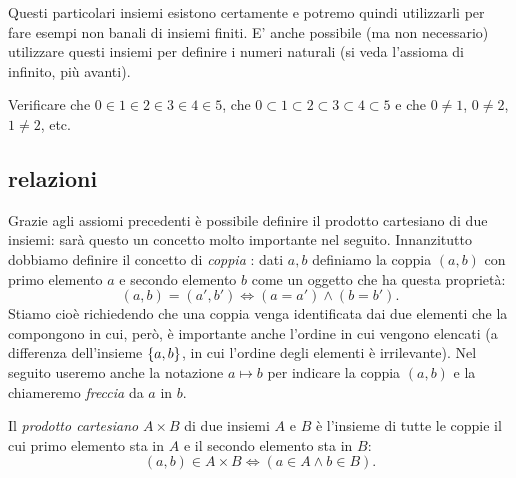 Questi particolari insiemi esistono certamente e potremo quindi utilizzarli 
per fare esempi non banali di insiemi finiti.
E' anche possibile (ma non necessario) utilizzare questi insiemi 
per definire i numeri naturali (si veda l'assioma di infinito, più avanti).

\begin{exercise}
Verificare che $0\in 1 \in 2 \in 3 \in 4 \in 5$, 
che $0\subset 1 \subset 2 \subset 3 \subset 4 \subset 5$ 
e che $0\neq 1$, $0\neq 2$, $1\neq 2$, etc.
\end{exercise}

\subsection{relazioni}

Grazie agli assiomi precedenti è possibile definire il prodotto cartesiano
di due insiemi: sarà questo un concetto molto importante nel seguito.
Innanzitutto dobbiamo definire il concetto di \emph{coppia}%
%
: dati
$a,b$ definiamo la coppia $(a,b)$ con primo elemento $a$ e secondo elemento $b$
come un oggetto che ha questa proprietà:%
%
\begin{equation}\label{eq:coppia}
  (a, b) = (a', b') \iff (a=a') \land (b=b').
\end{equation}
Stiamo cioè richiedendo che una coppia venga identificata dai due
elementi che la compongono in cui, però, è importante anche l'ordine in
cui vengono elencati (a differenza dell'insieme ${\left\{ a,b \right\}}$, in cui
l'ordine degli elementi è irrilevante).
Nel seguito useremo anche la notazione $a \mapsto b$ per indicare 
la coppia $(a,b)$ e la chiameremo \emph{freccia}%
%
 da $a$ in $b$.

Il \emph{prodotto cartesiano} $A\times B$ di due insiemi $A$ e $B$
è l'insieme di tutte le coppie
il cui primo elemento sta in $A$ e
il secondo elemento sta in $B$:
\[
  (a, b) \in A \times B \iff (a\in A \land b\in B).
\]

